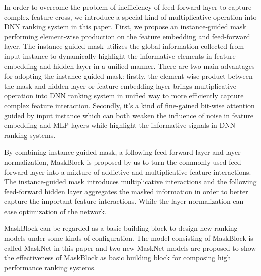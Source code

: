 \documentclass[sigconf]{acmart}
\begin{document}
In order to overcome the problem of inefficiency of feed-forward layer to capture complex feature cross, we introduce a special kind of multiplicative operation into DNN ranking system in this paper. First, we propose an instance-guided mask performing element-wise production on the feature embedding and feed-forward layer. The instance-guided mask utilizes the global information collected from input instance to dynamically highlight the informative elements in feature embedding and hidden layer in a unified manner. There are two main advantages for adopting the instance-guided mask: firstly, the element-wise product between the mask and hidden layer or feature embedding layer brings multiplicative operation into DNN ranking system in unified way to more efficiently capture complex feature interaction. Secondly, it’s a kind of fine-gained bit-wise attention guided by input instance which can both weaken the influence of noise in feature embedding and MLP layers while highlight the informative signals in DNN ranking systems.


By combining instance-guided mask, a following feed-forward layer and layer normalization, MaskBlock is proposed by us to turn the commonly used feed-forward layer into a mixture of addictive and multiplicative feature interactions. The instance-guided mask introduces multiplicative interactions and the following feed-forward hidden layer aggregates the masked  information in order to better capture the important feature interactions. While the layer normalization can ease optimization of the network.




MaskBlock can be regarded as a  basic building block to design new ranking models under some kinds of configuration. The model consisting of MaskBlock is called MaskNet in this paper and two new MaskNet models are proposed to show the effectiveness of MaskBlock as basic building block for composing high performance ranking systems.
\end{document}
